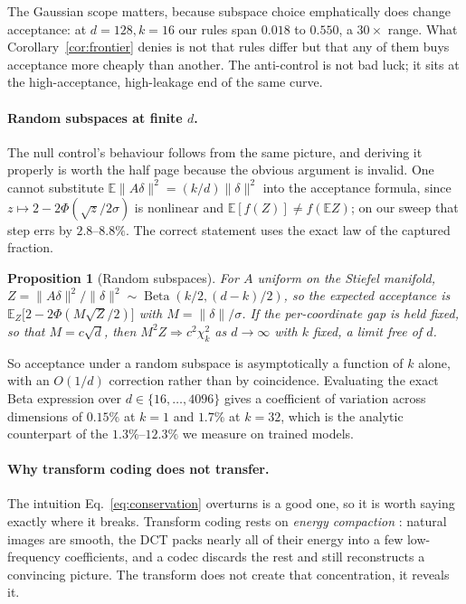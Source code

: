 \documentclass[10pt]{article}
\newtheorem{proposition}{Proposition}
\newcommand{\E}{\mathbb{E}}
\newcommand{\dd}{d}
\newcommand{\kk}{k}
\begin{document}
The Gaussian scope matters, because subspace choice emphatically does change acceptance: at
$\dd{=}128, \kk{=}16$ our rules span $0.018$ to $0.550$, a $30\times$ range. What Corollary~\ref{cor:frontier}
denies is not that rules differ but that any of them buys acceptance more cheaply than another. The
anti-control is not bad luck; it sits at the high-acceptance, high-leakage end of the same curve.

\paragraph{Random subspaces at finite $\dd$.} The null control's behaviour follows from the same
picture, and deriving it properly is worth the half page because the obvious argument is invalid.
One cannot substitute $\E\|A\delta\|^2 = (\kk/\dd)\|\delta\|^2$ into the acceptance formula, since
$z \mapsto 2 - 2\Phi(\sqrt{z}/2\sigma)$ is nonlinear and $\E[f(Z)] \ne f(\E Z)$; on our sweep that
step errs by $2.8$--$8.8\%$. The correct statement uses the exact law of the captured fraction.

\begin{proposition}[Random subspaces]
\label{prop:random}
For $A$ uniform on the Stiefel manifold, $Z = \|A\delta\|^2/\|\delta\|^2 \sim
\operatorname{Beta}(\kk/2, (\dd-\kk)/2)$, so the expected acceptance is
$\E_Z\bigl[2 - 2\Phi(M\sqrt{Z}/2)\bigr]$ with $M = \|\delta\|/\sigma$. If the per-coordinate gap is
held fixed, so that $M = c\sqrt{\dd}$, then $M^2 Z \Rightarrow c^2 \chi^2_\kk$ as $\dd \to \infty$
with $\kk$ fixed, a limit free of $\dd$.
\end{proposition}

So acceptance under a random subspace is asymptotically a function of $\kk$ alone, with an $O(1/\dd)$
correction rather than by coincidence. Evaluating the exact Beta expression over $\dd \in \{16,\dots,4096\}$
gives a coefficient of variation across dimensions of $0.15\%$ at $\kk{=}1$ and $1.7\%$ at $\kk{=}32$,
which is the analytic counterpart of the $1.3\%$--$12.3\%$ we measure on trained models.

\paragraph{Why transform coding does not transfer.} The intuition Eq.~\ref{eq:conservation} overturns
is a good one, so it is worth saying exactly where it breaks. Transform coding rests on \emph{energy
compaction} \citep{goyal2001transform}: natural images are smooth, the DCT packs nearly all of their
energy into a few low-frequency coefficients, and a codec discards the rest and still reconstructs a
convincing picture. The transform does not create that concentration, it reveals it.
\end{document}
